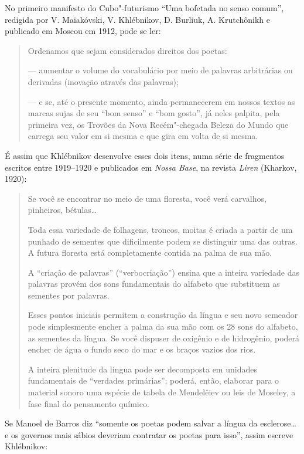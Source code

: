 No primeiro manifesto do Cubo"-futurismo ``Uma bofetada no senso comum'',
redigida por V. Maiakóvski, V. Khlébnikov, D. Burliuk, A. Krutchônikh e
publicado em Moscou em 1912, pode se ler:

\begin{quote}
\noindent{}Ordenamos que sejam considerados direitos dos poetas:

\noindent{} --- aumentar o volume do vocabulário por meio de palavras arbitrárias
ou derivadas (inovação através das palavras);

\noindent{} --- e se, até o presente momento, ainda permanecerem em nossos textos
as marcas sujas de seu ``bom senso'' e ``bom gosto'', já neles palpita,
pela primeira vez, os Trovões da Nova Recém"-chegada Beleza do Mundo que
carrega seu valor em si mesma e que gira em volta de si mesma.
\end{quote}

É assim que Khlébnikov desenvolve esses dois itens, numa série de
fragmentos escritos entre 1919--1920 e publicados em \emph{Nossa Base},
na revista \emph{Liren} (Kharkov, 1920):

\begin{quote}
Se você se encontrar no meio de uma floresta, você verá carvalhos,
pinheiros, bétulas\ldots{}

Toda essa variedade de folhagens, troncos, moitas é criada a partir de
um punhado de sementes que dificilmente podem se distinguir uma das
outras. A futura floresta está completamente contida na palma de sua
mão.

A ``criação de palavras'' (``verbocriação'') ensina que a inteira
variedade das palavras provém dos sons fundamentais do alfabeto que
substituem as sementes por palavras.

Esses pontos iniciais permitem a construção da língua e seu novo
semeador pode simplesmente encher a palma da sua mão com os 28 sons do
alfabeto, as sementes da língua. Se você dispuser de oxigênio e de
hidrogênio, poderá encher de água o fundo seco do mar e os braços vazios
dos rios.

A inteira plenitude da língua pode ser decomposta em unidades
fundamentais de ``verdades primárias''; poderá, então, elaborar para o
material sonoro uma espécie de tabela de Mendelêiev ou leis de Moseley,
a fase final do pensamento químico.
\end{quote}

Se Manoel de Barros diz ``somente os poetas podem salvar a língua da
esclerose\ldots{} e os governos mais sábios deveriam contratar os poetas para
isso'', assim escreve
Khlébnikov:


